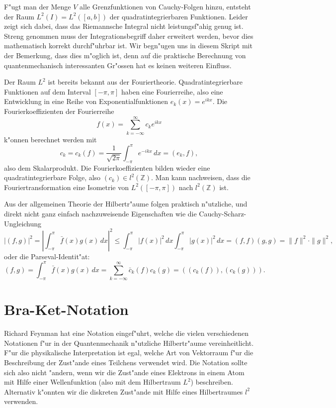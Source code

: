 F"ugt man der Menge $V$ alle Grenzfunktionen von Cauchy-Folgen hinzu,
entsteht der Raum $L^2(I)=L^2([a,b])$ der quadratintegrierbaren Funktionen.
Leider zeigt sich dabei, dass das Riemannsche Integral nicht leistungsf"ahig
genug ist.
Streng genommen muss der Integrationsbegriff daher erweitert
werden, bevor dies mathematisch korrekt durchf"uhrbar ist.
Wir begn"ugen uns in diesem Skript mit der Bemerkung, dass dies m"oglich ist, 
denn auf die praktische Berechnung von quantenmechanisch interessanten
Gr"ossen hat es keinen weiteren Einfluss.

Der Raum $L^2$ ist bereits bekannt aus der Fouriertheorie.
Quadratintegrierbare Funktionen auf dem Interval $[-\pi,\pi]$ haben
eine Fourierreihe, also eine Entwicklung in eine Reihe von
Exponentialfunktionen $e_k(x)=e^{ikx}$.
Die Fourierkoeffizienten der Fourierreihe
\[
f(x)=\sum_{k=-\infty}^\infty c_ke^{ikx}
\]
k"onnen berechnet werden mit
\[
c_k=c_k(f)=\frac{1}{\sqrt{2\pi}}\int_{-\pi}^{\pi} e^{-ikx} \,dx=(e_k,f),
\]
also dem Skalarprodukt. Die Fourierkoeffizienten bilden wieder eine
quadratintegrierbare Folge, also $(c_k)\in l^2(\mathbb Z)$. Man kann
nachweisen, dass die Fouriertransformation eine Isometrie von $L^2([-\pi,\pi])$
nach $l^2(\mathbb Z)$ ist.

Aus der allgemeinen Theorie der Hilbertr"aume
folgen praktisch n"utzliche, und direkt nicht ganz einfach
nachzuweisende Eigenschaften wie die Cauchy-Scharz-Ungleichung
\[
|(f,g)|^2
=
\left|
\int_{-\pi}^\pi \bar f(x)g(x)\,dx
\right|^2
\le 
\int_{-\pi}^\pi |f(x)|^2\,dx
\int_{-\pi}^\pi |g(x)|^2\,dx
=
(f,f)(g,g)=\|f\|^2\cdot\|g\|^2,
\]
oder die Parseval-Identit"at:
\[
(f,g)
=
\int_{-\pi}^{\pi}\bar f(x)g(x)\,dx
=
\sum_{k=-\infty}^\infty \bar c_k(f)c_k(g)
=
((c_k(f)),(c_k(g))).
\]

\section{Bra-Ket-Notation}
Richard Feynman hat eine Notation eingef"uhrt, welche die vielen verschiedenen
Notationen f"ur in der Quantenmechanik n"utzliche Hilbertr"aume
vereinheitlicht.
F"ur die physikalische Interpretation ist egal, welche Art von
Vektorraum f"ur die Beschreibung der Zust"ande eines Teilchens verwendet
wird.
Die Notation sollte sich also nicht "andern, wenn wir die Zust"ande eines
Elektrons in einem Atom mit Hilfe einer Wellenfunktion (also mit dem
Hilbertraum $L^2$) beschreiben. Alternativ k"onnten wir die diskreten
Zust"ande mit Hilfe eines Hilbertraumes $l^2$ verwenden.

